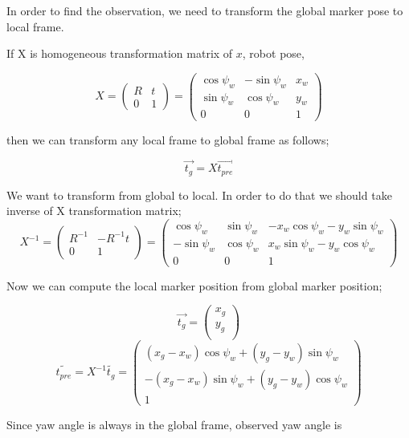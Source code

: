 \documentclass[14pt,a4paper]{article}
\begin{document}
		In order to find the observation, we need to transform the global marker pose to local frame.
		
		If X is homogeneous transformation matrix of $x$, robot pose,
		
		$$	X =	\begin{pmatrix} 
					R & t \\
					0 & 1 
				\end{pmatrix}
			=	\begin{pmatrix}
					\cos\psi_{w}	 &	-\sin\psi_{w} & x_{w}\\	
					\sin\psi_{w} &	\cos\psi_{w}	 & y_{w}\\
					0		 &		0	&	1
				\end{pmatrix}
		$$	
		
		then we can transform any local frame to global frame as follows;
		
				\[\vec{t_g}= X \vec{t_{pre}} \]
				
		We want to transform from global to local. In order to do that we should take inverse of X transformation matrix;
		$$	X^{-1} =	\begin{pmatrix} 
		
					R^{-1} & -R^{-1}t \\
					0 & 1 
				\end{pmatrix}
			=	\begin{pmatrix}
					\cos\psi_{w}	 &	\sin\psi_{w} & -x_{w}\cos\psi_{w}-y_{w}\sin\psi_{w}\\	
					-\sin\psi_{w} &	\cos\psi_{w}	 &  x_{w}\sin\psi_{w}-y_{w}\cos\psi_{w}\\
					0		 &		0	&	1
				\end{pmatrix}
		$$
		
		
		Now we can compute the local marker position from global marker position;
		
		\[\vec{t_{g}}= \left( \begin{array}{c}
						x_{g} \\ y_{g}\\ 
				\end{array} \right)\] 	
		$$
			\tilde{t_{pre}}  = X^{-1} \tilde{t_{g}}
			= \begin{pmatrix}
					(x_{g} - x_{w})\cos\psi_{w}	 +	(y_{g}-y_{w})\sin\psi_{w}\\ 	
					-(x_{g} - x_{w})\sin\psi_{w} +	(y_{g}-y_{w})\cos\psi_{w}\\
												1
				\end{pmatrix}
		$$
		
		Since yaw angle is always in the global frame, observed yaw angle is
		
\end{document}
